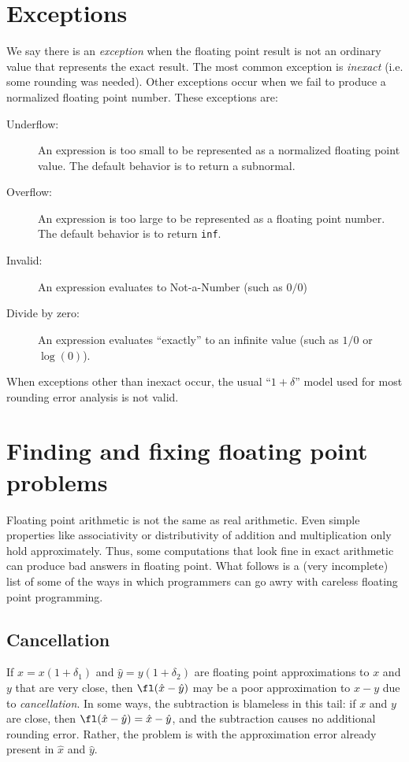 \documentclass[12pt, leqno]{article}
\begin{document}
\section*{Exceptions}

We say there is an {\em exception} when the floating point result is
not an ordinary value that represents the exact result.  The most
common exception is {\em inexact} (i.e. some rounding was needed).
Other exceptions occur when we fail to produce a normalized floating
point number.  These exceptions are:
\begin{description}
\item[Underflow:]
  An expression is too small to be represented as a normalized floating
  point value.  The default behavior is to return a subnormal.
\item[Overflow:]
  An expression is too large to be represented as a floating point
  number.  The default behavior is to return {\tt inf}.
\item[Invalid:]
  An expression evaluates to Not-a-Number (such as $0/0$)
\item[Divide by zero:]
  An expression evaluates ``exactly'' to an infinite value
  (such as $1/0$ or $\log(0)$).
\end{description}
When exceptions other than inexact occur, the usual ``$1 + \delta$''
model used for most rounding error analysis is not valid.

\section*{Finding and fixing floating point problems}

Floating point arithmetic is not the same as real arithmetic.  Even
simple properties like associativity or distributivity of addition and
multiplication only hold approximately.  Thus, some computations that
look fine in exact arithmetic can produce bad answers in floating
point.  What follows is a (very incomplete) list of some of the ways
in which programmers can go awry with careless floating point
programming.

\subsection*{Cancellation}

If $\hat{x} = x(1+\delta_1)$ and $\hat{y} = y(1+\delta_2)$ are
floating point approximations to $x$ and $y$ that are very close, then
$\fl(\hat{x}-\hat{y})$ may be a poor approximation to $x-y$ due to
{\em cancellation}.  In some ways, the subtraction is blameless in
this tail: if $x$ and $y$ are close, then $\fl(\hat{x}-\hat{y}) =
\hat{x}-\hat{y}$, and the subtraction causes no additional rounding
error.  Rather, the problem is with the approximation error already
present in $\hat{x}$ and $\hat{y}$.
\end{document}
